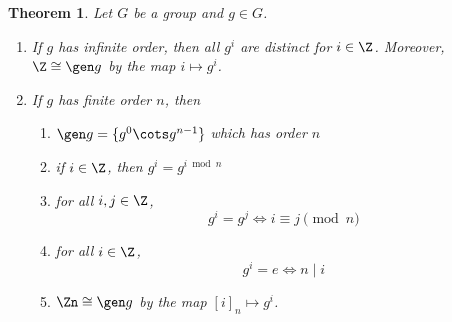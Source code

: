 \documentclass[12pt]{amsart}
\theoremstyle{plain}
\newtheorem{thm}{Theorem}[section]
\theoremstyle{definition}
\theoremstyle{remark}
\begin{document}
\begin{thm} \label{orders-thm}
  Let $G$ be a group and $g\in G$.
  \begin{enumerate}
  \item If $g$ has infinite order, then all $g^i$ are distinct for $i\in \Z$.
  Moreover, $\Z \cong \gen g$ by the map $i\mapsto g^i$.
  \item If $g$ has finite order $n$, then
  \begin{enumerate}
  \item $\gen g=\{g^0\cots g^{n-1}\}$ which has order $n$
  \item if $i\in\Z$, then $g^i=g^{i \bmod n}$
  \item for all $i,j\in\Z$, 
  \[ g^i=g^j \iff i\equiv j \pmod n\]
  \item for all $i\in \Z$,
    \[ g^i=e \iff n\mid i\]
  \item $\Zn\cong \gen g$ by the map $[i]_n\mapsto g^i$.
  \end{enumerate}
  \end{enumerate}
\end{thm}
\end{document}
